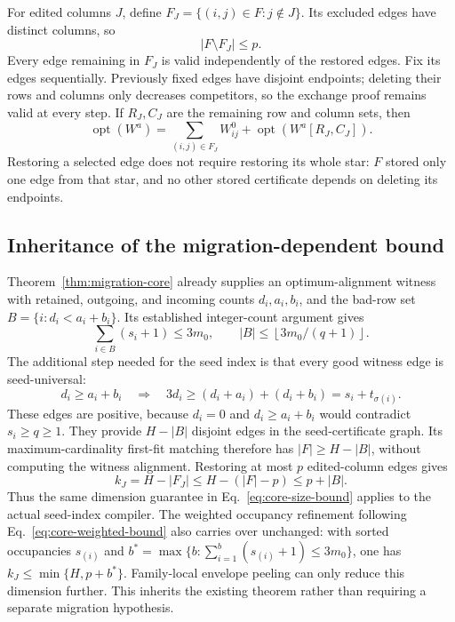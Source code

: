 \documentclass[11pt]{article}
\begin{document}
For edited columns $J$, define $F_J=\{(i,j)\in F:j\notin J\}$. Its excluded edges have distinct columns, so
\begin{equation}\label{eq:seed-restored-edges}
|F\setminus F_J|\le p.
\end{equation}
Every edge remaining in $F_J$ is valid independently of the restored edges. Fix its edges sequentially. Previously fixed edges have disjoint endpoints; deleting their rows and columns only decreases competitors, so the exchange proof remains valid at every step. If $R_J,C_J$ are the remaining row and column sets, then
\begin{equation}\label{eq:seed-specialization}
\operatorname{opt}(W^a)=\sum_{(i,j)\in F_J}W^0_{ij}+\operatorname{opt}(W^a[R_J,C_J]).
\end{equation}
Restoring a selected edge does not require restoring its whole star: $F$ stored only one edge from that star, and no other stored certificate depends on deleting its endpoints.

\subsection{Inheritance of the migration-dependent bound}
Theorem~\ref{thm:migration-core} already supplies an optimum-alignment witness with retained, outgoing, and incoming counts $d_i,a_i,b_i$, and the bad-row set $B=\{i:d_i<a_i+b_i\}$. Its established integer-count argument gives
\begin{equation}
\sum_{i\in B}(s_i+1)\le3m_0,\qquad |B|\le\left\lfloor3m_0/(q+1)\right\rfloor.
\end{equation}
The additional step needed for the seed index is that every good witness edge is seed-universal:
\begin{equation}
d_i\ge a_i+b_i\quad\Longrightarrow\quad 3d_i\ge(d_i+a_i)+(d_i+b_i)=s_i+t_{\sigma(i)}.
\end{equation}
These edges are positive, because $d_i=0$ and $d_i\ge a_i+b_i$ would contradict $s_i\ge q\ge1$. They provide $H-|B|$ disjoint edges in the seed-certificate graph. Its maximum-cardinality first-fit matching therefore has $|F|\ge H-|B|$, without computing the witness alignment. Restoring at most $p$ edited-column edges gives
\begin{equation}
k_J=H-|F_J|\le H-(|F|-p)\le p+|B|.
\end{equation}
Thus the same dimension guarantee in Eq.~\eqref{eq:core-size-bound} applies to the actual seed-index compiler. The weighted occupancy refinement following Eq.~\eqref{eq:core-weighted-bound} also carries over unchanged: with sorted occupancies $s_{(i)}$ and $b^*=\max\{b:\sum_{i=1}^b(s_{(i)}+1)\le3m_0\}$, one has $k_J\le\min\{H,p+b^*\}$. Family-local envelope peeling can only reduce this dimension further. This inherits the existing theorem rather than requiring a separate migration hypothesis.
\end{document}

